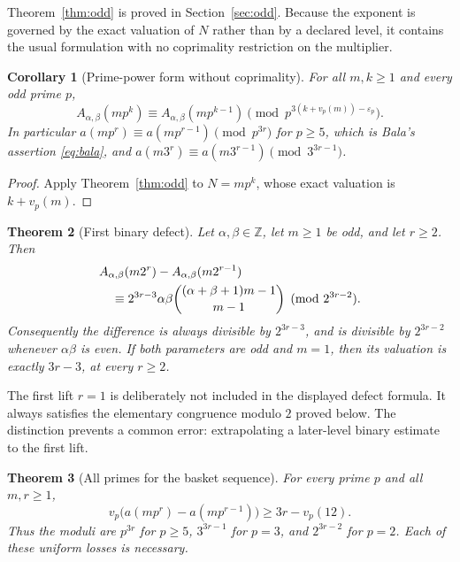 \documentclass[11pt,a4paper]{article}
\numberwithin{equation}{section}
\newtheorem{theorem}{Theorem}[section]
\newtheorem{corollary}[theorem]{Corollary}
\theoremstyle{definition}
\theoremstyle{remark}
\newcommand{\Z}{\mathbb Z}
\newcommand{\eps}{\varepsilon}
\newcommand{\A}{A_{\alpha,\beta}}
\begin{document}
Theorem~\ref{thm:odd} is proved in Section~\ref{sec:odd}. Because the
exponent is governed by the exact valuation of $N$ rather than by a declared
level, it contains the usual formulation with no coprimality restriction on
the multiplier.

\begin{corollary}[Prime-power form without coprimality]\label{cor:strong-m}
For all $m,k\ge1$ and every odd prime $p$,
\begin{equation}\label{eq:strong-m}
 \A(mp^k)\equiv\A(mp^{k-1})
 \pmod{p^{3(k+v_p(m))-\eps_p}}.
\end{equation}
In particular $a(mp^r)\equiv a(mp^{r-1})\pmod{p^{3r}}$ for $p\ge5$, which is
Bala's assertion \eqref{eq:bala}, and
$a(m3^r)\equiv a(m3^{r-1})\pmod{3^{3r-1}}$.
\end{corollary}
\begin{proof}
Apply Theorem~\ref{thm:odd} to $N=mp^k$, whose exact valuation is
$k+v_p(m)$.
\end{proof}

\begin{theorem}[First binary defect]\label{thm:binary}
Let $\alpha,\beta\in\Z$, let $m\ge1$ be odd, and let $r\ge2$. Then
\begin{align}\label{eq:binary-defect}
 &\A(m2^r)-\A(m2^{r-1})\notag\\
 &\quad\equiv
 2^{3r-3}\alpha\beta
 \binom{(\alpha+\beta+1)m-1}{m-1}
 \pmod{2^{3r-2}}.
\end{align}
Consequently the difference is always divisible by $2^{3r-3}$, and is
divisible by $2^{3r-2}$ whenever $\alpha\beta$ is even. If both parameters
are odd and $m=1$, then its valuation is exactly $3r-3$, at every $r\ge2$.
\end{theorem}

The first lift $r=1$ is deliberately not included in the displayed defect
formula. It always satisfies the elementary congruence modulo $2$ proved
below. The distinction prevents a common error: extrapolating a later-level
binary estimate to the first lift.

\begin{theorem}[All primes for the basket sequence]\label{thm:allprime}
For every prime $p$ and all $m,r\ge1$,
\begin{equation}\label{eq:all-prime}
 v_p\bigl(a(mp^r)-a(mp^{r-1})\bigr)
 \ge 3r-v_p(12).
\end{equation}
Thus the moduli are $p^{3r}$ for $p\ge5$, $3^{3r-1}$ for $p=3$, and
$2^{3r-2}$ for $p=2$. Each of these uniform losses is necessary.
\end{theorem}
\end{document}
